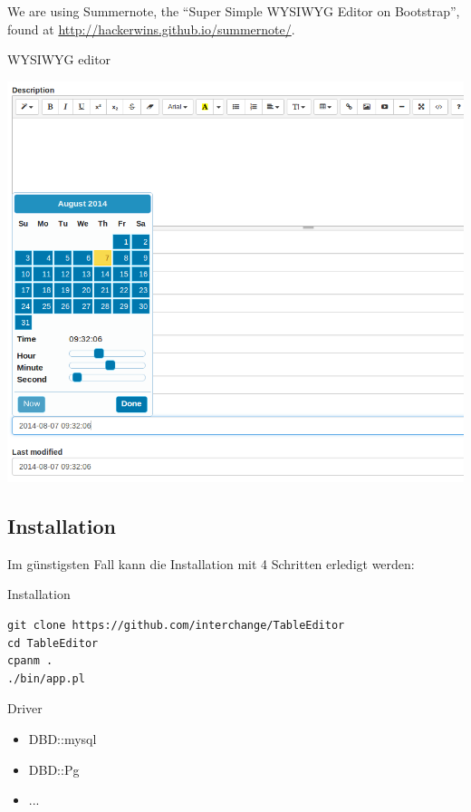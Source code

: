 We are using Summernote, the ``Super Simple WYSIWYG Editor on Bootstrap'',
found at \url{http://hackerwins.github.io/summernote/}.

\begin{frame}[plain]{WYSIWYG editor}
  \begin{center}
    \includegraphics[width=\textwidth,height=1\textheight,keepaspectratio]{images/datepicker-htmleditor.png}
  \end{center}
\end{frame}

\subsection{Installation}
Im günstigsten Fall kann die Installation mit 4 Schritten
erledigt werden:

\begin{frame}[fragile]{Installation}
\begin{lstlisting}
git clone https://github.com/interchange/TableEditor
cd TableEditor
cpanm .
./bin/app.pl
\end{lstlisting}
\end{frame}

\begin{frame}[fragile]{Driver}
\begin{itemize}
\item DBD::mysql
\item DBD::Pg
\item ...
\end{itemize}
\end{frame}

